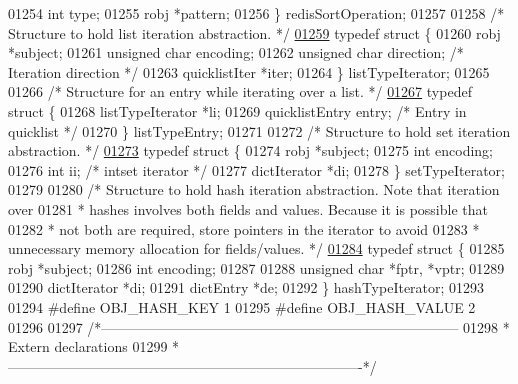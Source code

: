 \begin{DoxyCode}
{{{{{{{01254     \textcolor{keywordtype}{int} type;
01255     robj *pattern;
01256 \} redisSortOperation;
01257 
01258 \textcolor{comment}{/* Structure to hold list iteration abstraction. */}
\hyperlink{structlistTypeIterator}{01259} \textcolor{keyword}{typedef} \textcolor{keyword}{struct} \{
01260     robj *subject;
01261     \textcolor{keywordtype}{unsigned} \textcolor{keywordtype}{char} encoding;
01262     \textcolor{keywordtype}{unsigned} \textcolor{keywordtype}{char} direction; \textcolor{comment}{/* Iteration direction */}
01263     quicklistIter *iter;
01264 \} listTypeIterator;
01265 
01266 \textcolor{comment}{/* Structure for an entry while iterating over a list. */}
\hyperlink{structlistTypeEntry}{01267} \textcolor{keyword}{typedef} \textcolor{keyword}{struct} \{
01268     listTypeIterator *li;
01269     quicklistEntry entry; \textcolor{comment}{/* Entry in quicklist */}
01270 \} listTypeEntry;
01271 
01272 \textcolor{comment}{/* Structure to hold set iteration abstraction. */}
\hyperlink{structsetTypeIterator}{01273} \textcolor{keyword}{typedef} \textcolor{keyword}{struct} \{
01274     robj *subject;
01275     \textcolor{keywordtype}{int} encoding;
01276     \textcolor{keywordtype}{int} ii; \textcolor{comment}{/* intset iterator */}
01277     dictIterator *di;
01278 \} setTypeIterator;
01279 
01280 \textcolor{comment}{/* Structure to hold hash iteration abstraction. Note that iteration over}
01281 \textcolor{comment}{ * hashes involves both fields and values. Because it is possible that}
01282 \textcolor{comment}{ * not both are required, store pointers in the iterator to avoid}
01283 \textcolor{comment}{ * unnecessary memory allocation for fields/values. */}
\hyperlink{structhashTypeIterator}{01284} \textcolor{keyword}{typedef} \textcolor{keyword}{struct} \{
01285     robj *subject;
01286     \textcolor{keywordtype}{int} encoding;
01287 
01288     \textcolor{keywordtype}{unsigned} \textcolor{keywordtype}{char} *fptr, *vptr;
01289 
01290     dictIterator *di;
01291     dictEntry *de;
01292 \} hashTypeIterator;
01293 
01294 \textcolor{preprocessor}{#}\textcolor{preprocessor}{define} \textcolor{preprocessor}{OBJ\_HASH\_KEY} 1
01295 \textcolor{preprocessor}{#}\textcolor{preprocessor}{define} \textcolor{preprocessor}{OBJ\_HASH\_VALUE} 2
01296 
01297 \textcolor{comment}{/*-----------------------------------------------------------------------------}
01298 \textcolor{comment}{ * Extern declarations}
01299 \textcolor{comment}{ *----------------------------------------------------------------------------*/}
}}}}}}}
\end{DoxyCode}

